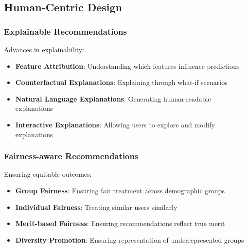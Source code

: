 \subsection{Human-Centric Design}

\subsubsection{Explainable Recommendations}

Advances in explainability:
\begin{itemize}
    \item \textbf{Feature Attribution}: Understanding which features influence predictions
    \item \textbf{Counterfactual Explanations}: Explaining through what-if scenarios
    \item \textbf{Natural Language Explanations}: Generating human-readable explanations
    \item \textbf{Interactive Explanations}: Allowing users to explore and modify explanations
\end{itemize}

\subsubsection{Fairness-aware Recommendations}

Ensuring equitable outcomes:
\begin{itemize}
    \item \textbf{Group Fairness}: Ensuring fair treatment across demographic groups
    \item \textbf{Individual Fairness}: Treating similar users similarly
    \item \textbf{Merit-based Fairness}: Ensuring recommendations reflect true merit
    \item \textbf{Diversity Promotion}: Ensuring representation of underrepresented groups
\end{itemize}

